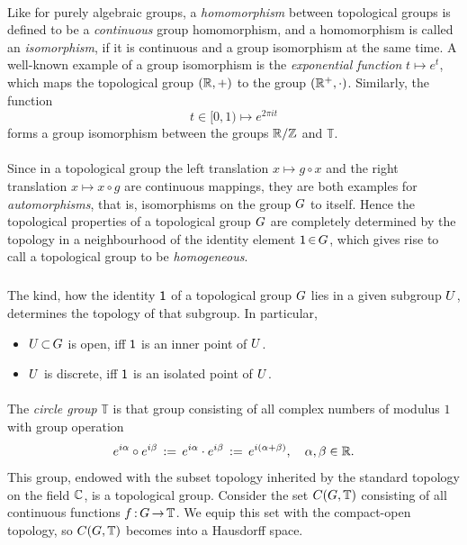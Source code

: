 \documentclass[11pt,twoside]{article}
\begin{document}
\paragraph{} %
Like for purely algebraic groups,
a \textit{homomorphism} between topological groups
is defined to be a \textit{continuous} group homomorphism,
and a homomorphism is called an \textit{isomorphism},
if it is continuous and a group isomorphism at the same time.
A well-known example of a group isomorphism is
the \textit{exponential function} $t \mapsto e^{t}$,
which maps the topological group $({\mathbb{R}},+)$ to the group $({\mathbb{R}}^+,\cdot)$.
Similarly,
the function
\[
t \in [0,1) \mapsto e^{2 \pi it}
\]
forms a group isomorphism between the groups ${\mathbb{R}} / {\mathbb{Z}}$ and $\mathbb{T}$.

\paragraph{}
Since in a topological group the
left  translation $x \mapsto g \circ x$ and the
right translation $x \mapsto x \circ g$
are continuous mappings,
they are both examples for \textit{automorphisms},
that is,
isomorphisms on the group $G$ to itself.
Hence the topological properties of a topological group $G$
are completely determined by the topology in a neighbourhood
of the identity element ${\mathsf{1}} {\,\in\,} G$,
which gives rise to call a topological group to be \textit{homogeneous}.

\subparagraph{}
The kind,
how the identity ${\mathsf{1}}$ of a topological group $G$
lies in a given subgroup $U$,
determines the topology of that subgroup.
In particular,

\begin{itemize}[leftmargin=9mm,itemsep=1pt]
\item[1.]
$U {\,\subset\,} G$ is open, iff ${\mathsf{1}}$ is an inner point of $U$.

\item[2.]
$U$ is discrete, iff ${\mathsf{1}}$ is an isolated point of $U$.
\end{itemize}

\paragraph{} %
The \textit{circle group} $\mathbb{T}$ is that group
consisting of all complex numbers of modulus $1$ with group operation
\[
e^{i \alpha} \circ e^{i \beta} \,:=\,
e^{i \alpha} \cdot e^{i \beta} \,:=\,
e^{i(\alpha + \beta)},
\quad \alpha,\beta \in {\mathbb{R}}.
\]
This group,
endowed with the subset topology inherited
by the standard topology on the field ${\mathbb{C}}$,
is a topological group.
Consider the set $C(G,\mathbb{T})$ consisting of all
continuous functions $f {\,:\,} G {\,\to\,} \mathbb{T}$.
We equip this set with the compact-open topology,
so $C(G,\mathbb{T})$ becomes into a Hausdorff space.
\end{document}
